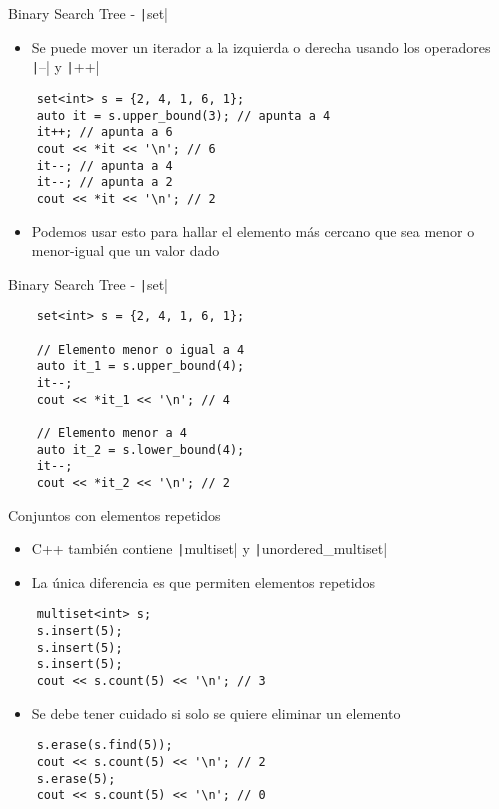 \documentclass[10pt]{beamer}
\newcommand{\bi}{\begin{itemize}}
\newcommand{\ei}{\end{itemize}}
\begin{document}
\begin{frame}[fragile]{Binary Search Tree - \texttt|set|}
  \bi
    \item Se puede mover un iterador a la izquierda o derecha usando los operadores \texttt|--| y \texttt|++|
  \ei
  \begin{verbatim}
    set<int> s = {2, 4, 1, 6, 1};
    auto it = s.upper_bound(3); // apunta a 4
    it++; // apunta a 6
    cout << *it << '\n'; // 6
    it--; // apunta a 4
    it--; // apunta a 2
    cout << *it << '\n'; // 2
  \end{verbatim}
  \bi
    \item Podemos usar esto para hallar el elemento más cercano que sea menor o menor-igual que un valor dado
  \ei
\end{frame}

\begin{frame}[fragile]{Binary Search Tree - \texttt|set|}
  \begin{verbatim}
    set<int> s = {2, 4, 1, 6, 1};

    // Elemento menor o igual a 4
    auto it_1 = s.upper_bound(4); 
    it--;
    cout << *it_1 << '\n'; // 4

    // Elemento menor a 4
    auto it_2 = s.lower_bound(4); 
    it--;
    cout << *it_2 << '\n'; // 2
  \end{verbatim}
\end{frame}

\begin{frame}[fragile]{Conjuntos con elementos repetidos}
  \bi
    \item C++ también contiene \texttt|multiset| y \texttt|unordered_multiset|
    \item La única diferencia es que permiten elementos repetidos
  \ei
  \begin{verbatim}
    multiset<int> s;
    s.insert(5);
    s.insert(5);
    s.insert(5);
    cout << s.count(5) << '\n'; // 3
  \end{verbatim}
  \bi
    \item Se debe tener cuidado si solo se quiere eliminar un elemento
  \ei
  \begin{verbatim}
    s.erase(s.find(5));
    cout << s.count(5) << '\n'; // 2
    s.erase(5);
    cout << s.count(5) << '\n'; // 0
  \end{verbatim}
\end{frame}
\end{document}
